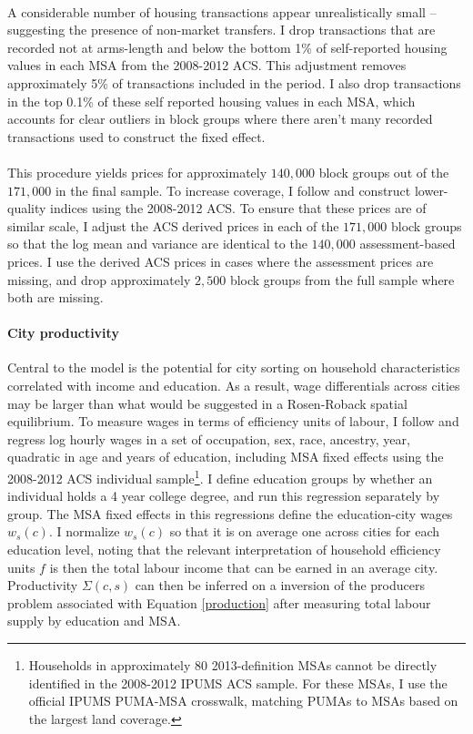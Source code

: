 \documentclass[]{article}
\begin{document}
\paragraph*{}
A considerable number of housing transactions appear unrealistically small -- suggesting the presence of non-market transfers. I drop transactions that are recorded not at arms-length and below the bottom 1\% of self-reported housing values in each MSA from the 2008-2012 ACS. This adjustment removes approximately 5\% of transactions included in the period. I also drop transactions in the top 0.1\% of these self reported housing values in each MSA, which accounts for clear outliers in block groups where there aren't many recorded transactions used to construct the fixed effect.  
\paragraph*{}
This procedure yields prices for approximately $140,000$ block groups out of the $171,000$ in the final sample. To increase coverage, I follow \cite{BSH} and construct lower-quality indices using the 2008-2012 ACS. To ensure that these prices are of similar scale, I adjust the ACS derived prices in each of the $171,000$ block groups so that the log mean and variance are identical to the $140,000$ assessment-based prices. I use the derived ACS prices in cases where the assessment prices are missing, and drop approximately $2,500$ block groups from the full sample where both are missing. 

\paragraph*{City productivity} Central to the model is the potential for city sorting on household characteristics correlated with income and education. As a result, wage differentials across cities may be larger than what would be suggested in a Rosen-Roback spatial equilibrium. To measure wages in terms of efficiency units of labour, I follow \cite{ineqincreased} and regress log hourly wages in a set of occupation, sex, race, ancestry, year, quadratic in age and years of education, including MSA fixed effects using the 2008-2012 ACS individual sample\footnote{Households in approximately 80 2013-definition MSAs cannot be directly identified in the 2008-2012 IPUMS ACS sample. For these MSAs, I use the official IPUMS PUMA-MSA crosswalk, matching PUMAs to MSAs based on the largest land coverage.}. I define education groups by whether an individual holds a 4 year college degree, and run this regression separately by group. The MSA
fixed effects in this regressions define the education-city wages $w_{s}(c)$. I normalize $w_{s}(c)$ so that it is on average one across cities for each education level, noting that the relevant interpretation of household efficiency units $f$ is then the total labour income that can be earned in an average city. Productivity $\Sigma(c, s)$ can then be inferred on a inversion of the producers problem associated with Equation \eqref{production} after measuring total labour supply by education and MSA. 
\end{document}
